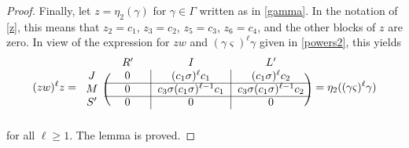 \documentclass[ALCO,Unicode]{cedram}
\begin{document}
\begin{proof}
Finally, let $z=\eta_2(\gamma)$ for $\gamma\in\Gamma$ written as in \eqref{gamma}.
In the notation of \eqref{z}, this means that $z_2=c_1$, $z_3=c_2$, $z_5=c_3$, $z_6=c_4$, and the other blocks of $z$ are zero. In view of the expression for $zw$ and $(\gamma\varsigma)^\ell\gamma$ given in \eqref{powers2}, this yields
\[(zw)^\ell z=\begin{blockarray}{cccc}
{} & {\quad R'\quad} & {\quad I\quad} & {\quad L'\quad}\\
\begin{block}{c(c|c|c)}
J & 0 & (c_1\sigma)^\ell c_1 & (c_1\sigma)^{\ell}c_2\\
\cline{2-4}
M & 0 & c_3\sigma(c_1\sigma)^{\ell-1}c_1 & c_3\sigma(c_1\sigma)^{\ell-1}c_2\\
\cline{2-4}
S' & 0 & 0 & 0\\
\end{block}
\end{blockarray}\,=\eta_2((\gamma\varsigma)^\ell\gamma)\]
for all $\ell\geq 1$. The lemma is proved.
\end{proof}
\end{document}

